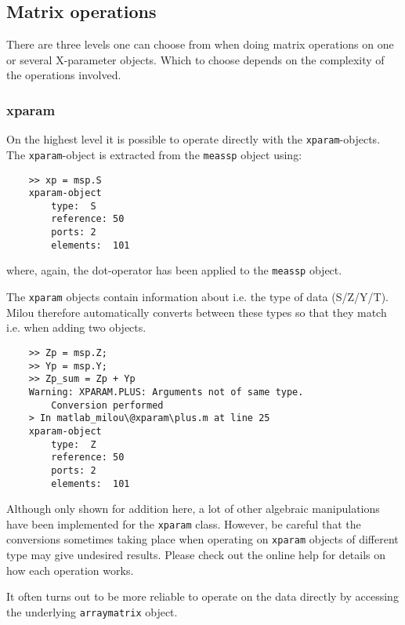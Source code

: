 \subsection{Matrix operations}
There are three levels one can choose from when doing matrix
operations on one or several X-parameter objects. Which to choose
depends on the complexity of the operations involved.

\subsubsection{xparam}
On the highest level it is possible to operate directly with the
\verb"xparam"-objects. The \verb"xparam"-object is extracted from
the \verb"meassp" object using:
\begin{small}
\begin{verbatim}
    >> xp = msp.S
    xparam-object
        type:  S
        reference: 50
        ports: 2
        elements:  101
\end{verbatim}
\end{small}
where, again, the dot-operator has been applied to the
\verb"meassp" object.

The \verb"xparam" objects contain information about i.e. the type
of data (S/Z/Y/T). Milou therefore automatically converts between
these types so that they match i.e. when adding two objects.
\begin{small}
\begin{verbatim}
    >> Zp = msp.Z;
    >> Yp = msp.Y;
    >> Zp_sum = Zp + Yp
    Warning: XPARAM.PLUS: Arguments not of same type.
        Conversion performed
    > In matlab_milou\@xparam\plus.m at line 25
    xparam-object
        type:  Z
        reference: 50
        ports: 2
        elements:  101
\end{verbatim}
\end{small}
Although only shown for addition here, a lot of other algebraic
manipulations have been implemented for the \verb"xparam" class.
However, be careful that the conversions sometimes taking place
when operating on \verb"xparam" objects of different type may give
undesired results. Please check out the online help for details on
how each operation works.

It often turns out to be more reliable to operate on the data
directly by accessing the underlying \verb"arraymatrix" object.

